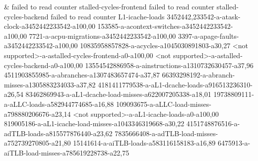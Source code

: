 &
failed to read counter stalled-cycles-frontend failed to read counter stalled-cycles-backend failed to read counter L1-icache-loads 3452442,233542-a-atask-clock-a3452442233542-a100,00 153585-a-acontext-switches-a3452442233542-a100,00 7721-a-acpu-migrations-a3452442233542-a100,00 3397-a-apage-faults-a3452442233542-a100,00 10835958857828-a-acycles-a1045030891803-a30,27 <not supported>-a-astalled-cycles-frontend-a0-a100,00 <not supported>-a-astalled-cycles-backend-a0-a100,00 13554542886958-a-ainstructions-a1310732630457-a37,96 4511903855985-a-abranches-a1307483657474-a37,87 66393298192-a-abranch-misses-a1305883234033-a37,82 4181411779538-a-aL1-dcache-loads-a916513236310-a26,54 83462869943-a-aL1-dcache-load-misses-a622007205338-a18,01 19738809111-a-aLLC-loads-a582944774685-a16,88 109093675-a-aLLC-load-misses-a798880206676-a23,14 <not supported>-a-aL1-icache-loads-a0-a100,00 819005186-a-aL1-icache-load-misses-a1043346319668-a30,22 4151748876516-a-adTLB-loads-a815577876440-a23,62 7835666408-a-adTLB-load-misses-a752739270805-a21,80 15141614-a-aiTLB-loads-a583116158183-a16,89 6475913-a-aiTLB-load-misses-a785619228738-a22,75
